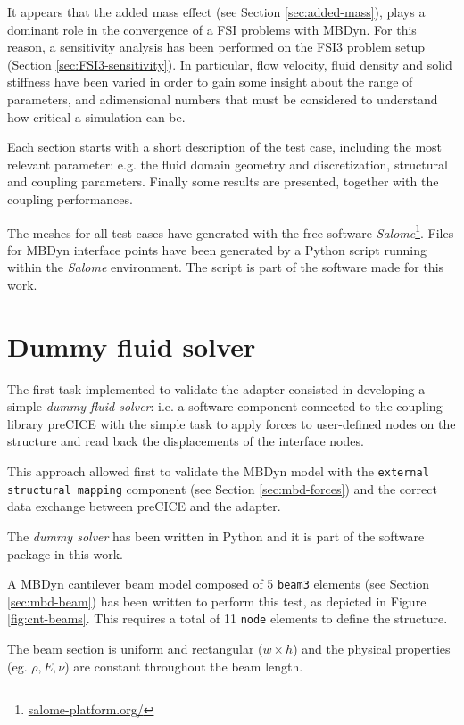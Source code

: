 It appears that the added mass effect (see Section \ref{sec:added-mass}), plays a dominant role in the convergence of a FSI problems with MBDyn. For this reason, a sensitivity analysis has been performed on the FSI3 problem setup (Section \ref{sec:FSI3-sensitivity}). In particular, flow velocity, fluid density and solid stiffness have been varied in order to gain some insight about the range of parameters, and adimensional numbers that must be considered to understand how critical a simulation can be.     

Each section starts with a short description of the test case, including the most relevant parameter: e.g. the fluid domain geometry and discretization, structural and coupling parameters. Finally some results are presented, together with the coupling performances.

The meshes for all test cases have generated with the free software \textit{Salome}\footnote{\href{https://www.salome-platform.org/}{salome-platform.org/}}. Files for MBDyn interface points have been generated by a Python script running within the \textit{Salome} environment. The script is part of the software made for this work. 


\section{Dummy fluid solver}
\label{sec:dummy}

The first task implemented to validate the adapter consisted in developing a simple \textit{dummy fluid solver}: i.e. a software component connected to the coupling library preCICE with the simple task to apply forces to user-defined nodes on the structure and read back the displacements of the interface nodes.

This approach allowed first to validate the MBDyn model with the \texttt{external structural mapping} component (see Section \ref{sec:mbd-forces}) and the correct data exchange between preCICE and the adapter. 

The \textit{dummy solver} has been written in Python and it is part of the software package in this work.

A MBDyn cantilever beam model composed of 5 \texttt{beam3} elements (see Section \ref{sec:mbd-beam}) has been written to perform this test, as depicted in Figure \ref{fig:cnt-beams}. This requires a total of 11 \texttt{node} elements to define the structure.

The beam section is uniform and rectangular ($w \times h$) and the physical properties (eg. $\rho, E, \nu$) are constant throughout the beam length. 


